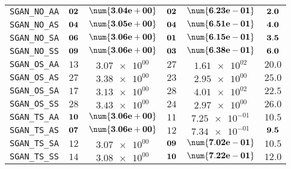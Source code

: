 \begin{xltabular}{\textwidth}{l||CC|CC||C}
	\texttt{SGAN\_NO\_AA} & $\bf 02$ & $\bf \num{3.04e+00}$ & $\bf 02$ & $\bf \num{6.23e-01}$ &$\bf 2.0$  \\
	\texttt{SGAN\_NO\_AS} & $\bf 04$ & $\bf \num{3.05e+00}$ & $\bf 04$ & $\bf \num{6.51e-01}$ &$\bf 4.0$  \\
	\texttt{SGAN\_NO\_SA} & $\bf 06$ & $\bf \num{3.06e+00}$ & $\bf 01$ & $\bf \num{6.15e-01}$ &$\bf 3.5$  \\
	\texttt{SGAN\_NO\_SS} & $\bf 09$ & $\bf \num{3.06e+00}$ & $\bf 03$ & $\bf \num{6.38e-01}$ &$\bf 6.0$  \\
	\texttt{SGAN\_OS\_AA} & $ 13$ & $ \num{3.07e+00}$ & $ 27$ & $ \num{1.61e+02}$ &$ 20.0$  \\
	\texttt{SGAN\_OS\_AS} & $ 27$ & $ \num{3.38e+00}$ & $ 23$ & $ \num{2.95e+00}$ &$ 25.0$  \\
	\texttt{SGAN\_OS\_SA} & $ 17$ & $ \num{3.13e+00}$ & $ 28$ & $ \num{4.01e+02}$ &$ 22.5$  \\
	\texttt{SGAN\_OS\_SS} & $ 28$ & $ \num{3.43e+00}$ & $ 24$ & $ \num{2.97e+00}$ &$ 26.0$  \\
	\texttt{SGAN\_TS\_AA} & $\bf 10$ & $\bf \num{3.06e+00}$ & $ 11$ & $ \num{7.25e-01}$ &$ 10.5$  \\
	\texttt{SGAN\_TS\_AS} & $\bf 07$ & $\bf \num{3.06e+00}$ & $ 12$ & $ \num{7.34e-01}$ &$\bf 9.5$  \\
	\texttt{SGAN\_TS\_SA} & $ 12$ & $ \num{3.07e+00}$ & $\bf 09$ & $\bf \num{7.02e-01}$ &$ 10.5$  \\
	\texttt{SGAN\_TS\_SS} & $ 14$ & $ \num{3.08e+00}$ & $\bf 10$ & $\bf \num{7.22e-01}$ &$ 12.0$  \\ \hline

\end{xltabular}

